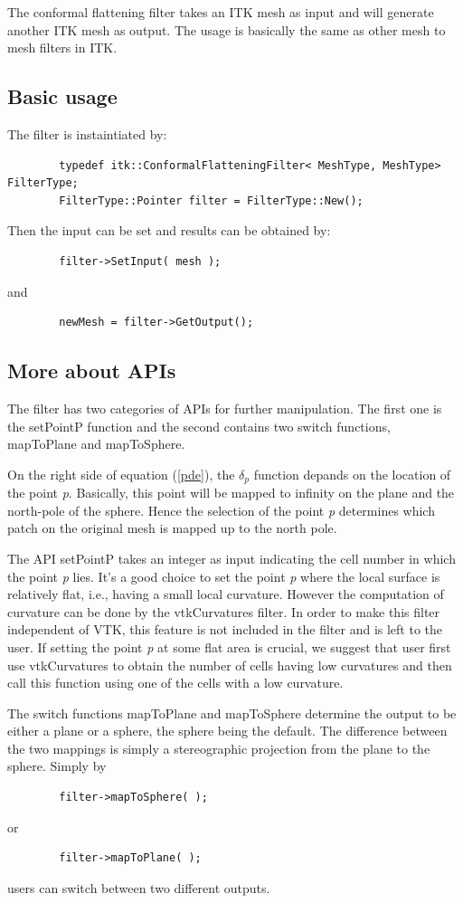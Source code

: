 \documentclass{InsightArticle}
\begin{document}
	The conformal flattening filter takes an ITK mesh as input and will
	generate another ITK mesh as output. The usage is basically the same
	as other mesh to mesh filters in ITK.

	\subsection{Basic usage}
	The filter is instaintiated by:
	\begin{verbatim}
		typedef itk::ConformalFlatteningFilter< MeshType, MeshType>  FilterType;
		FilterType::Pointer filter = FilterType::New();
	\end{verbatim}
	Then the input can be set and results can be obtained by:
	\begin{verbatim}
		filter->SetInput( mesh ); 
	\end{verbatim}
	and
	\begin{verbatim}
		newMesh = filter->GetOutput(); 
	\end{verbatim}

	\subsection{More about APIs}
	The filter has two categories of APIs for further manipulation. The
	first one is the setPointP function and the second contains two switch
	functions, mapToPlane and mapToSphere.

	On the right side of equation (\ref{pde}), the $\delta_p$ function
	depands on the location of the point \emph{p}. Basically, this point
	will be mapped to infinity on the plane and the north-pole of the
	sphere. Hence the selection of the point \emph{p} determines which
	patch on the original mesh is mapped up to the north pole.

	The API setPointP takes an integer as input indicating the cell number
	in which the point \emph{p} lies. It's a good choice to set the point
	\emph{p} where the local surface is relatively flat, i.e., having a
	small local curvature. However the computation of curvature can be
	done by the vtkCurvatures filter. In order to make this filter
	independent of VTK, this feature is not included in the filter and is
	left to the user. If setting the point \emph{p} at some flat area is
	crucial, we suggest that user first use vtkCurvatures to obtain the
	number of cells having low curvatures and then call this function
	using one of the cells with a low curvature.

	The switch functions mapToPlane and mapToSphere determine the output
	to be either a plane or a sphere, the sphere being the default. The
	difference between the two mappings is simply a stereographic
	projection from the plane to the sphere. Simply by
	\begin{verbatim}
		filter->mapToSphere( ); 
	\end{verbatim}
	or
	\begin{verbatim}
		filter->mapToPlane( ); 
	\end{verbatim}
	users can switch between two different outputs.
\end{document}
